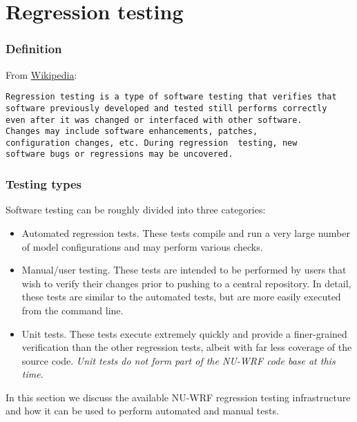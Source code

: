 \section{Regression testing}
\label{sec:reg_testing}

\begin{frame}[fragile]\frametitle{Definition}

From \href{https://en.wikipedia.org/wiki/Regression_testing}{Wikipedia}:
\footnotesize{
\begin{verbatim}
Regression testing is a type of software testing that verifies that
software previously developed and tested still performs correctly
even after it was changed or interfaced with other software. 
Changes may include software enhancements, patches, 
configuration changes, etc. During regression  testing, new 
software bugs or regressions may be uncovered. 
\end{verbatim}
}
\end{frame}

\begin{frame}[fragile]\frametitle{Testing types}

Software testing can be roughly divided into three categories:
\begin{itemize}
\item Automated regression  tests.   These tests compile and run a very large number of model configurations and may perform various checks.
\item Manual/user testing.   These tests are intended to be performed by users that wish to verify their changes prior to pushing to a central repository.   In detail, these tests are similar to the automated tests, but are more easily executed from the command line. 
\item Unit tests.  These tests execute extremely quickly and provide a finer-grained verification than the other regression tests, albeit with far less coverage of the source code. \emph{Unit tests do not form part of the NU-WRF code base at this time}. 
\end{itemize}
In this section we discuss the available NU-WRF regression testing infrastructure and how it can be used to perform automated and manual tests.
\end{frame}

